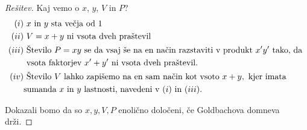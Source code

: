 \documentclass{amsart}
\begin{document}
\begin{proof}[Rešitev]
    Kaj vemo o $x$, $y$, $V$ in $P$?
    \begin{align*}
    (i)&\textnormal{ } x \textnormal{ in } y \textnormal{ sta večja od } 1\\
    (ii)&\textnormal{ } V= x+y \textnormal{ ni vsota dveh praštevil}\\
    (iii)& \textnormal{ Število }P=xy\textnormal{ se da vsaj še na en način razstaviti v produkt }x'y'\textnormal{ tako, da }\\
    &\textnormal{ vsota faktorjev }x'+y' \textnormal{ ni vsota dveh praštevil.}\\
    (iv)&\textnormal{ Število } V \textnormal{ lahko zapišemo na en sam način kot vsoto }x+y,\textnormal{ kjer imata}\\
    & \textnormal{sumanda }
    x \textnormal{ in } y \textnormal{ lastnosti, navedeni v }(i)\textnormal{ in }(iii). \\
    \end{align*}

    Dokazali bomo da so $x, y, V, P$ enolično določeni, če Goldbachova domneva drži.


\end{proof}
\end{document}
